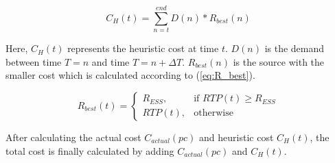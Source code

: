 \begin{equation}
\label{eq:C_H}
C_H(t) = \sum_{n=t}^{end} D(n)*R_{best}(n)
\end{equation}

Here, $C_H(t)$ represents the heuristic cost at time $t$. $D(n)$ is the demand between time $T = n$ and time $T = n+\Delta T$. $R_{best}(n)$ is the source with the smaller cost which is calculated according to (\ref{eq:R_best}).

\begin{equation}
\label{eq:R_best}
R_{best}(t) = 
\begin{cases}
    R_{ESS},& \text{if } RTP(t)\geq R_{ESS}\\
    RTP(t),              & \text{otherwise}
\end{cases}
\end{equation}

After calculating the actual cost  $C_{actual}(pc)$ and heuristic cost $C_H(t)$, the total cost is finally calculated by adding  $C_{actual}(pc)$ and $C_H(t)$.

